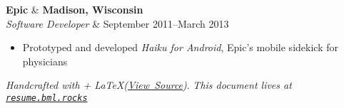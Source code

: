 \documentclass[line,margin]{res}
\begin{document}
\begin{resume}
    \begin{tabularx}
      \textbf{Epic}               & \hfill \textbf{Madison, Wisconsin}  \\
      \textit{Software Developer} & \hfill September 2011--March 2013 \\
    \end{tabularx}
    \vspace{-0.15in}
    \begin{itemize}
        \item Prototyped and developed \textit{Haiku for Android}, Epic's mobile sidekick for physicians
    \end{itemize}

\end{resume}

\vfill
\textit{Handcrafted with \heartsuit + \LaTeX (\href{https://github.com/Cheezmeister/resume/raw/master/b_luchen_resume.tex}{View\ Source})}.
\hfill
\textit{This document lives at \texttt{\href{http://resume.bml.rocks}{resume.bml.rocks}}}
\\
\end{document}
